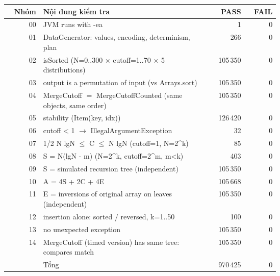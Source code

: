 \begin{tabular}{rp{0.62\linewidth}rr}
\toprule
Nhóm & Nội dung kiểm tra & PASS & FAIL \\
\midrule
00 & JVM runs with -ea & 1 & 0 \\
01 & DataGenerator: values, encoding, determinism, plan & 266 & 0 \\
02 & isSorted (N=0..300 $\times$ cutoff=1..70 $\times$ 5 distributions) & 105\,350 & 0 \\
03 & output is a permutation of input (vs Arrays.sort) & 105\,350 & 0 \\
04 & MergeCutoff $=$ MergeCutoffCounted (same objects, same order) & 105\,350 & 0 \\
05 & stability (Item(key, idx)) & 126\,420 & 0 \\
06 & cutoff < 1 $\to$ IllegalArgumentException & 32 & 0 \\
07 & 1/2 N lgN $\le$ C $\le$ N lgN (cutoff=1, N=2\^{}k) & 85 & 0 \\
08 & S = N(lgN - m) (N=2\^{}k, cutoff=2\^{}m, m<k) & 403 & 0 \\
09 & S = simulated recursion tree (independent) & 105\,350 & 0 \\
10 & A = 4S + 2C + 4E & 105\,668 & 0 \\
11 & E = inversions of original array on leaves (independent) & 105\,350 & 0 \\
12 & insertion alone: sorted / reversed, k=1..50 & 100 & 0 \\
13 & no unexpected exception & 105\,350 & 0 \\
14 & MergeCutoff (timed version) has same tree: compares match & 105\,350 & 0 \\
\midrule
 & Tổng & 970\,425 & 0 \\
\bottomrule
\end{tabular}
